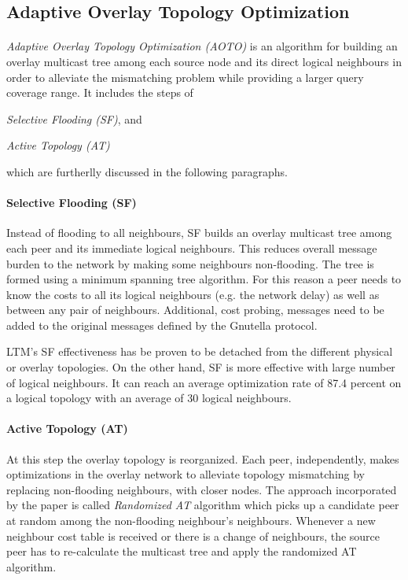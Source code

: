 \documentclass[a4paper,10pt]{article}
\begin{document}
\subsection{Adaptive Overlay Topology Optimization}

\paragraph*{}
\emph{Adaptive Overlay Topology Optimization (AOTO)} \cite{liu_auto_2003} is an algorithm for building an overlay multicast tree among each source node and its direct logical neighbours in order to alleviate the mismatching problem while providing a larger query coverage range. It includes the steps of
\begin{inparaenum}
  \item \emph{Selective Flooding (SF)}, and
  \item \emph{Active Topology (AT)}
\end{inparaenum}
which are furtherlly discussed in the following paragraphs.

\paragraph*{Selective Flooding (SF)}
Instead of flooding to all neighbours, SF builds an overlay multicast tree among each peer and its immediate logical neighbours. This reduces overall message burden to the network by making some neighbours non-flooding. The tree is formed using a minimum spanning tree algorithm. For this reason a peer needs to know the costs to all its logical neighbours (e.g. the network delay) as well as between any pair of neighbours. Additional, cost probing, messages need to be added to the original messages defined by the Gnutella protocol.

LTM's SF effectiveness has be proven to be detached from the different physical or overlay topologies. On the other hand, SF is more effective with large number of logical neighbours. It can reach an average optimization rate of 87.4 percent on a logical topology with an average of 30 logical neighbours. 

\paragraph*{Active Topology (AT)}
At this step the overlay topology is reorganized. Each peer, independently, makes optimizations in the overlay network to alleviate topology mismatching by replacing non-flooding neighbours, with closer nodes. The approach incorporated by the paper is called \emph{Randomized AT} algorithm which picks up a candidate peer at random among the non-flooding neighbour's neighbours. Whenever a new neighbour cost table is received or there is a change of neighbours, the source peer has to re-calculate the multicast tree and apply the randomized AT algorithm.
\end{document}

